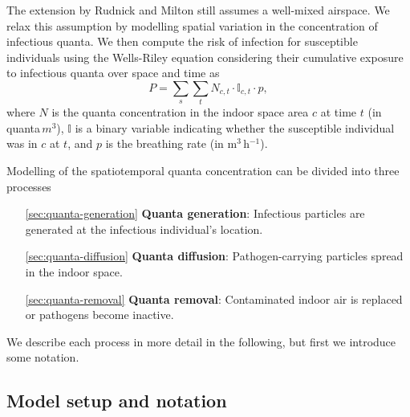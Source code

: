 \documentclass[fleqn,11pt]{wlscirep_supp}
\begin{document}
The extension by Rudnick and Milton still assumes a well-mixed airspace. We relax this assumption by modelling spatial variation in the concentration of infectious quanta. We then compute the risk of infection for susceptible individuals using the Wells-Riley equation considering their cumulative exposure to infectious quanta over space and time as 
\begin{equation}\label{eq:spattemp-P}
    P = \sum_s \sum_t N_{c,t} \cdot \mathbb{I}_{c,t} \cdot p,
\end{equation}
where $N$ is the quanta concentration in the indoor space area $c$ at time $t$ (in quanta\,$m^3$), $\mathbb{I}$ is a binary variable indicating whether the susceptible individual was in $c$ at $t$, and $p$ is the breathing rate (in m$^3$\,h$^{-1}$). 

Modelling of the spatiotemporal quanta concentration can be divided into three processes
\begin{itemize}
    \item[\ref{sec:quanta-generation}] \textbf{Quanta generation}: Infectious particles are generated at the infectious individual's location. 
    \item[\ref{sec:quanta-diffusion}] \textbf{Quanta diffusion}: Pathogen-carrying particles spread in the indoor space. 
    \item[\ref{sec:quanta-removal}] \textbf{Quanta removal}: Contaminated indoor air is replaced or pathogens become inactive. 
\end{itemize}
We describe each process in more detail in the following, but first we introduce some notation. 

\subsection{Model setup and notation}
\end{document}
